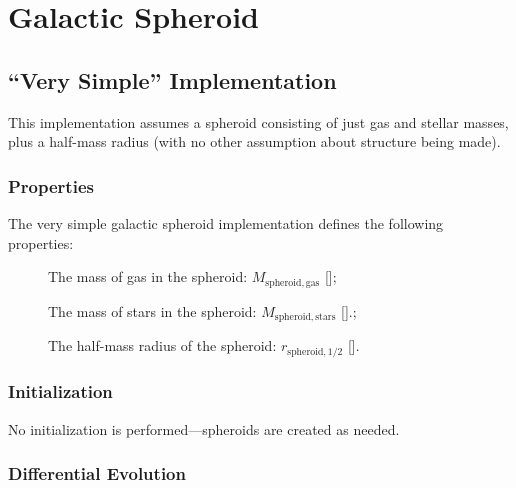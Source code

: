 \section{Galactic Spheroid}\label{sec:ComponentSpheroid}

\subsection{``Very Simple'' Implementation}

This implementation assumes a spheroid consisting of just gas and stellar masses, plus a half-mass radius (with no other assumption about structure being made).

\subsubsection{Properties}

The very simple galactic spheroid implementation defines the following properties:
\begin{description}
 \item [] The mass of gas in the spheroid: $M_\mathrm{spheroid, gas}$ [];
 \item [] The mass of stars in the spheroid: $M_\mathrm{spheroid, stars}$ [].;
 \item [] The half-mass radius of the spheroid: $r_\mathrm{spheroid, 1/2}$ [].
\end{description}

\subsubsection{Initialization}

No initialization is performed---spheroids are created as needed.

\subsubsection{Differential Evolution}

